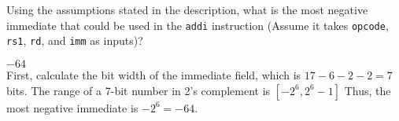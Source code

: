 \begin{blocksection}
\question
Using the assumptions stated in the description, what is the most negative immediate that could be used in the \lstinline$addi$ instruction (Assume it takes \lstinline$opcode$, \lstinline$rs1$, \lstinline$rd$, and \lstinline$imm$ as inputs)?
\begin{solution}[0.5in]
$-64$ \\
First, calculate the bit width of the immediate field, which is $17 − 6 − 2 − 2 = 7$ bits. The range of a 7-bit number in 2’s complement is $[−2^{6}, 2^{6} − 1]$ Thus, the most negative immediate is $−2^{6} = −64$.
\end{solution}



\end{blocksection}